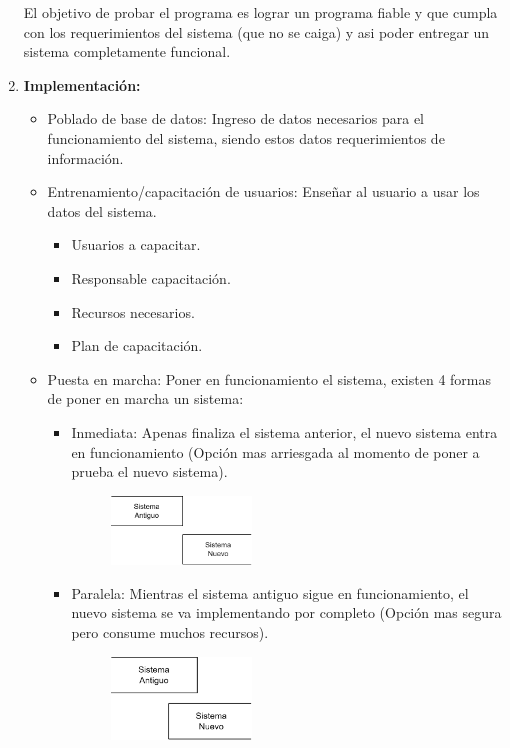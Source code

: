 \documentclass{templateNote}
\begin{document}
\begin{enumerate}
        El objetivo de probar el programa es lograr un programa fiable y que cumpla con los requerimientos del sistema (que no se caiga) y asi poder entregar un sistema completamente funcional.
    \item \hypertarget{imp}{\textbf{Implementación:}}
        \begin{itemize}
            \item Poblado de base de datos: Ingreso de datos necesarios para el funcionamiento del sistema, siendo estos datos requerimientos de información.
            \item Entrenamiento/capacitación de usuarios: Enseñar al usuario a usar los datos del sistema.
            \begin{itemize}
                \item Usuarios a capacitar.
                \item Responsable capacitación.
                \item Recursos necesarios.
                \item Plan de capacitación. 
            \end{itemize}
            \item Puesta en marcha: Poner en funcionamiento el sistema, existen 4 formas de poner en marcha un sistema:            
            \begin{itemize}
                \item Inmediata: Apenas finaliza el sistema anterior, el nuevo sistema entra en funcionamiento (Opción mas arriesgada al momento de poner a prueba el nuevo sistema).
                \begin{figure}[H]
                    \centering
                    \includegraphics[width=0.4\textwidth]{img/Inmediato.png}
                \end{figure}
                \item Paralela: Mientras el sistema antiguo sigue en funcionamiento, el nuevo sistema se va implementando por completo (Opción mas segura pero consume muchos recursos).
                \begin{figure}[H]
                    \centering
                    \includegraphics[width=0.4\textwidth]{img/Paralelo.png}

\end{figure}
\end{itemize}
\end{itemize}
\end{enumerate}
\end{document}
